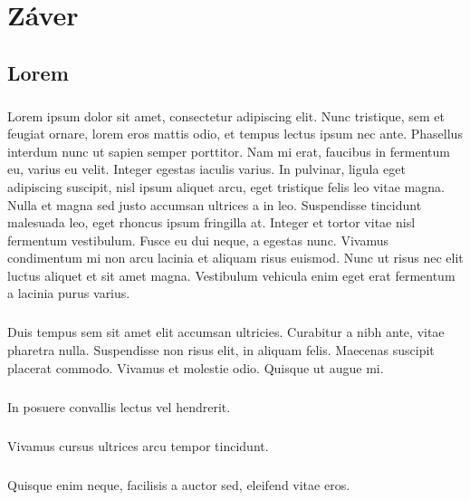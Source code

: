 \chapter{Záver}
\section{Lorem}
\paragraph{}
Lorem ipsum dolor sit amet, consectetur adipiscing elit. Nunc tristique, sem et feugiat ornare, lorem eros mattis odio, et tempus lectus ipsum nec ante. Phasellus interdum nunc ut sapien semper porttitor. Nam mi erat, faucibus in fermentum eu, varius eu velit. Integer egestas iaculis varius. In pulvinar, ligula eget adipiscing suscipit, nisl ipsum aliquet arcu, eget tristique felis leo vitae magna. Nulla et magna sed justo accumsan ultrices a in leo. Suspendisse tincidunt malesuada leo, eget rhoncus ipsum fringilla at. Integer et tortor vitae nisl fermentum vestibulum. Fusce eu dui neque, a egestas nunc. Vivamus condimentum mi non arcu lacinia et aliquam risus euismod. Nunc ut risus nec elit luctus aliquet et sit amet magna. Vestibulum vehicula enim eget erat fermentum a lacinia purus varius.

\paragraph{}
Duis tempus sem sit amet elit accumsan ultricies. Curabitur a nibh ante, vitae pharetra nulla. Suspendisse non risus elit, in aliquam felis. Maecenas suscipit placerat commodo. Vivamus et molestie odio. Quisque ut augue mi. 

\paragraph{}
In posuere convallis lectus vel hendrerit.

\paragraph{}
Vivamus cursus ultrices arcu tempor tincidunt.

\paragraph{}
Quisque enim neque, facilisis a auctor sed, eleifend vitae eros. 

